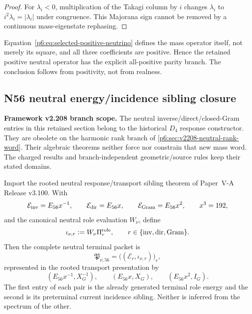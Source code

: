 \documentclass[12pt,a4paper]{article}
\begin{document}
\begin{proof}
For \(\lambda_i<0\), multiplication of the Takagi column by \(i\) changes
\(\lambda_i\) to \(i^2\lambda_i=|\lambda_i|\) under congruence.  This
Majorana sign cannot be removed by a continuous mass-eigenstate rephasing.
\end{proof}

\begin{corollary}
\label{p6:cor:selected-majorana-parity}
Equation~\eqref{p6:eq:selected-positive-neutrino} defines the mass operator
itself, not merely its square, and all three coefficients are positive.
Hence the retained positive neutral operator has the explicit all-positive parity branch.
The conclusion follows from positivity, not from realness.
\end{corollary}

\subsection{N56 neutral energy/incidence sibling closure}
\label{p6:sec:v593-n56-neutral-incidence-closure}

\noindent\textbf{Framework v2.208 branch scope.}
The neutral inverse/direct/closed-Gram entries in this retained section
belong to the historical $D_4$ response constructor. They are obsolete
on the harmonic rank branch of \ref{p6:sec:v2208-neutral-rank-word}.
Their algebraic theorems neither force nor constrain that new mass word.
The charged results and branch-independent geometric/source rules keep
their stated domains.


\begin{theorem}
\label{p6:thm:v593-neutral-energy-incidence-packet}
Import the rooted neutral response/transport sibling theorem of Paper~V-A
Release v3.100.  With
\[
 \mathcal E_{\rm inv}=E_{56}x^{-1},\qquad
 \mathcal E_{\rm dir}=E_{56}x,\qquad
 \mathcal E_{\rm Gram}=E_{56}x^2,
 \qquad x^3=192,
\]
and the canonical neutral role evaluation $W_\nu$, define
\[
 \iota_{\nu,r}:=W_\nu\Pi_r^{\rm role},
 \qquad r\in\{\mathrm{inv},\mathrm{dir},\mathrm{Gram}\}.
\]
Then the complete neutral terminal packet is
\[
 \boxed{
 \mathfrak P_{\nu,56}
 =\bigl((\mathcal E_r,\iota_{\nu,r})\bigr)_r,}
\]
represented in the rooted transport presentation by
\[
 \boxed{
 (E_{56}x^{-1},X_G^{-1}),\qquad
 (E_{56}x,X_G),\qquad
 (E_{56}x^2,I_G).}
\]
The first entry of each pair is the already generated terminal role energy and
the second is its preterminal current incidence sibling.  Neither is inferred
from the spectrum of the other.
\end{theorem}
\end{document}
